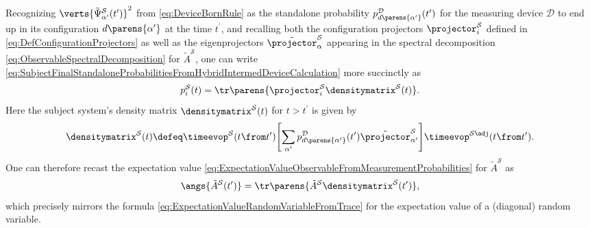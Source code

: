 \documentclass[12pt,english,prl,superscriptaddress,nobibnotes,nofootinbib]{revtex4-2}
\let\originalleft\left
\let\originalright\right
\renewcommand{\left}{\mathopen{}\mathclose\bgroup\originalleft}
\renewcommand{\right}{\aftergroup\egroup\originalright}
\begin{document}
Recognizing $\verts{\tilde{\Psi}_{\alpha^{\prime}}^{\mathcal{S}}\left(t^{\prime}\right)}^{2}$
from \eqref{eq:DeviceBornRule} as the standalone probability $p_{d\parens{\alpha^{\prime}}}^{\mathcal{D}}\left(t^{\prime}\right)$
for the measuring device $\mathcal{D}$ to end up in its configuration
$d\parens{\alpha^{\prime}}$ at the time $t^{\prime}$, and recalling
both the configuration projectors $\projector_{i}^{\mathcal{S}}$
defined in \eqref{eq:DefConfigurationProjectors} as well as the eigenprojectors
$\tilde{\projector}_{\alpha}^{\mathcal{S}}$ appearing in the spectral
decomposition \eqref{eq:ObservableSpectralDecomposition} for $\tilde{A}^{\mathcal{S}}$,
one can write \eqref{eq:SubjectFinalStandaloneProbabilitiesFromHybridIntermedDeviceCalculation}
more succinctly as 
\begin{equation}
p_{i}^{\mathcal{S}}\left(t\right)=\tr\parens{\projector_{i}^{\mathcal{S}}\densitymatrix^{\mathcal{S}}\left(t\right)}.\label{eq:SubjectFinalStandaloneProbabilitiesFromTraceAfterMeasurement}
\end{equation}
 Here the subject system's density matrix $\densitymatrix^{\mathcal{S}}\left(t\right)$
for $t>t^{\prime}$ is given by 
\begin{equation}
\densitymatrix^{\mathcal{S}}\left(t\right)\defeq\timeevop^{\mathcal{S}}\left(t\from t^{\prime}\right)\left[\sum_{\alpha^{\prime}}p_{d\parens{\alpha^{\prime}}}^{\mathcal{D}}\left(t^{\prime}\right)\tilde{\projector}_{\alpha^{\prime}}^{\mathcal{S}}\right]\timeevop^{\mathcal{S}\adj}\left(t\from t^{\prime}\right).\label{eq:SubjectFinalDensityMatrixAfterMeasurement}
\end{equation}
 One can therefore recast the expectation value \eqref{eq:ExpectationValueObservableFromMeasurementProbabilities}
for $\tilde{A}^{\mathcal{S}}$ as 
\begin{equation}
\angs{\tilde{A}^{\mathcal{S}}\left(t^{\prime}\right)}=\tr\parens{\tilde{A}^{\mathcal{S}}\densitymatrix^{\mathcal{S}}\left(t^{\prime}\right)},\label{eq:ExpectationValueObservableFromTrace}
\end{equation}
 which precisely mirrors the formula \eqref{eq:ExpectationValueRandomVariableFromTrace}
for the expectation value of a (diagonal) random variable.
\end{document}
